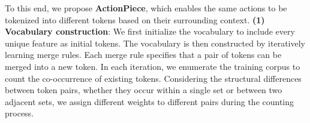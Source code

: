 To this end, we propose \textbf{ActionPiece}, which enables the same actions to be tokenized into different tokens based on their surrounding context.
\textbf{(1) Vocabulary construction}:
We first initialize the vocabulary to include every unique feature
as initial tokens. The vocabulary is then constructed by iteratively learning merge rules. Each merge rule specifies that a pair of tokens can be merged into a new token.
In each iteration, we enumerate the training corpus to count the co-occurrence of existing tokens. 
Considering the structural differences between token pairs, \eg whether they occur within a single set or between two adjacent sets, we assign different weights to different pairs during the counting process.
